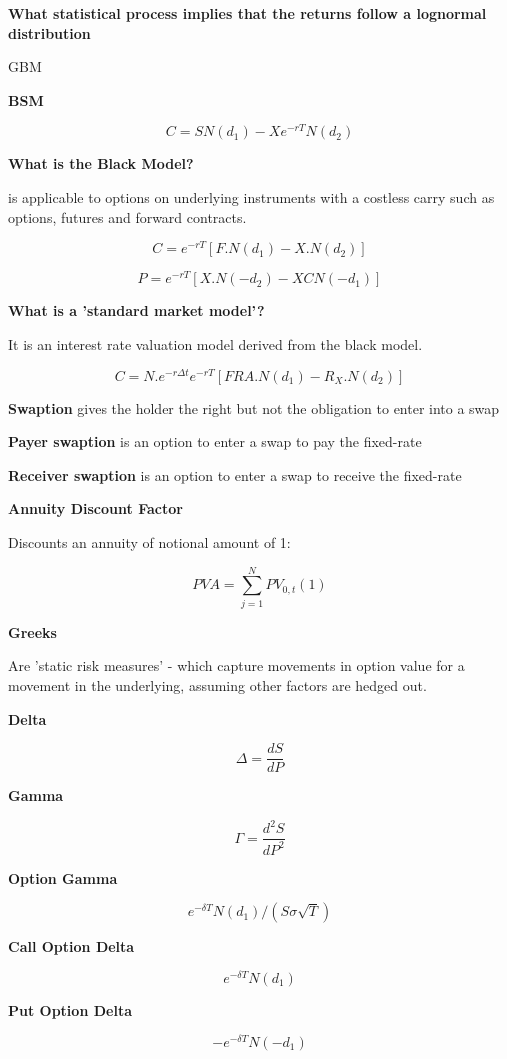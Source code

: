 \documentclass[12pt]{article}
\begin{document}
\textbf{What statistical process implies that the returns follow a lognormal distribution}

GBM

\textbf{BSM}

$$
C = S N(d_1) - X e^{-rT} N(d_2)
$$

\textbf{What is the Black Model?}

is applicable to options on underlying instruments with a costless carry such as options, futures and forward contracts. 

$$
C = e^{-rT}[F.N(d_1) - X.N(d_2)]
$$

$$
P= e^{-rT}[X.N(-d_2) - XCN(-d_1)]
$$

\textbf{What is a 'standard market model'?}

It is an interest rate valuation model derived from the black model.

$$
C = N. e^{-r\Delta t} e^{-rT}[FRA.N(d_1) - R_{X}.N(d_2)]
$$

\textbf{Swaption} gives the holder the right but not the obligation to enter into a swap

\textbf{Payer swaption}  is an option to enter a swap to pay the fixed-rate

\textbf{Receiver swaption}  is an option to enter a swap to receive the fixed-rate

\textbf{Annuity Discount Factor}

Discounts an annuity of notional amount of 1:

$$
PVA  = \sum_{j=1}^N PV_{0,t}(1)
$$

\newpage

\textbf{Greeks}

Are 'static risk measures' - which capture movements in option value for a movement in the underlying, assuming other factors are hedged out.

\textbf{Delta}

$$
\Delta = \dfrac{d S}{d P}
$$

\textbf{Gamma}

$$
\Gamma  = \dfrac{d^2S}{d P^2}
$$

\textbf{ Option Gamma}

$$
e^{-\delta T} N(d_1) / (S \sigma \sqrt{T})
$$

\textbf{Call Option Delta}

$$
e^{-\delta T} N(d_1)
$$

\textbf{Put Option Delta}

$$
- e^{-\delta T} N(- d_1)
$$
\end{document}
